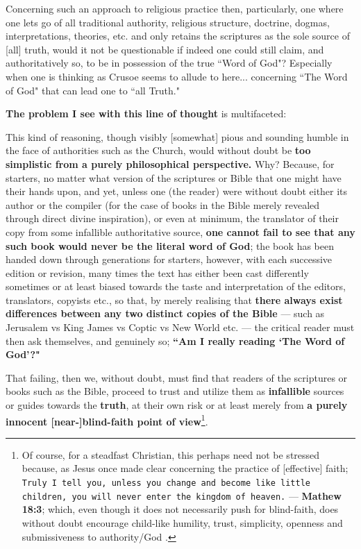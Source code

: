 \documentclass[a4paper]{article}
\begin{document}
Concerning such an approach to religious practice then, particularly, one where one lets go of all traditional authority, religious structure, doctrine, dogmas, interpretations, theories, etc. and only retains the scriptures as the sole source of [all] truth, would it not be questionable if indeed one could still claim, and authoritatively so, to be in possession of the true ``Word of God"? Especially when one is thinking as Crusoe seems to allude to here... concerning ``The Word of God" that can lead one to ``all Truth."


\textbf{The problem I see with this line of thought} is multifaceted:


This kind of reasoning, though visibly [somewhat] pious and sounding humble in the face of authorities such as the Church, would without doubt be \textbf{too simplistic from a purely philosophical perspective.} Why? Because, for starters, no matter what version of the scriptures or Bible that one might have their hands upon, and yet, unless one (the reader) were without doubt either its author or the compiler (for the case of books in the Bible merely revealed through direct divine inspiration), or even at minimum, the translator of their copy from some infallible authoritative source, \textbf{one cannot fail to see that any such book would never be the literal word of God}; the book has been handed down through generations for starters, however, with each successive edition or revision, many times the text has either been cast differently sometimes or at least biased towards the taste and interpretation of the editors, translators, copyists etc., so that, by merely realising that \textbf{there always exist differences between any two distinct copies of the Bible} --- such as Jerusalem vs King James vs Coptic vs New World etc. --- the critical reader must then ask themselves, and genuinely so; \textbf{``Am I really reading `The Word of God'?"}


That failing, then we, without doubt, must find that readers of the scriptures or books such as the Bible, proceed to trust and utilize them as \textbf{infallible} sources or guides towards the \textbf{truth}, at their own risk or at least merely from \textbf{a purely innocent [near-]blind-faith point of view}\footnote{Of course, for a steadfast Christian, this perhaps need not be stressed because, as Jesus once made clear concerning the practice of [effective] faith; \texttt{Truly I tell you, unless you change and become like little children, you will never enter the kingdom of heaven.} --- \textbf{Mathew 18:3}; which, even though it does not necessarily push for blind-faith, does without doubt encourage child-like humility, trust, simplicity, openness and submissiveness to authority/God \cite{copilot_assistant}.}. 
\end{document}
